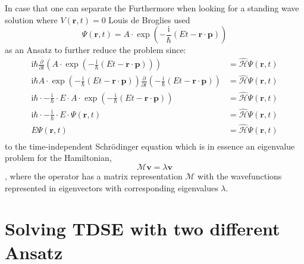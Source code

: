 \documentclass[12pt]{scrartcl}
\begin{document}
In case that one can separate the 
Furthermore when looking for a standing wave solution where $V(\mathbf{r},t)=0$ Louis de Broglies used
\begin{equation}
\Psi(\mathbf{r},t)=A\cdot \exp(-\frac{\mathrm{i}}{\hbar}(Et-\mathbf{r}\cdot\mathbf{p}))
\end{equation}
as an Ansatz to further reduce the problem since:
\begin{align*}
\mathrm{i} \hbar \frac{\partial }{\partial t} (A\cdot \exp(-\frac{\mathrm{i}}{\hbar}(Et-\mathbf{r}\cdot\mathbf{p})) )&=\hat{\mathcal{H}}\Psi(\mathbf{r},t)\\
\mathrm{i} \hbar  A\cdot \exp(-\frac{\mathrm{i}}{\hbar}(Et-\mathbf{r}\cdot\mathbf{p})) \frac{\partial }{\partial t}(-\frac{\mathrm{i}}{\hbar}(Et-\mathbf{r}\cdot\mathbf{p})) &=\hat{\mathcal{H}}\Psi(\mathbf{r},t)\\
\mathrm{i} \hbar\cdot -\frac{\mathrm{i}}{\hbar} \cdot E \cdot A\cdot \exp(-\frac{\mathrm{i}}{\hbar}(Et-\mathbf{r}\cdot\mathbf{p}))  &=\hat{\mathcal{H}}\Psi(\mathbf{r},t)\\
\mathrm{i} \hbar\cdot -\frac{\mathrm{i}}{\hbar} \cdot E \cdot \Psi(\mathbf{r},t)&=\hat{\mathcal{H}}\Psi(\mathbf{r},t)\\
 E \Psi(\mathbf{r},t)&=\hat{\mathcal{H}}\Psi(\mathbf{r},t)\\
\end{align*}
to the time-independent Schr\"odinger equation which is in essence an eigenvalue problem for the Hamiltonian,
\begin{equation}
\mathcal{M} \mathbf{v} = \lambda \mathbf{v}
\label{eigenvalueproblem}
\end{equation}
, where the operator has a matrix representation $\mathcal{M}$ with the wavefunctions represented in eigenvectors with corresponding eigenvalues $\lambda$.

\section{Solving TDSE with two different Ansatz}
\end{document}
